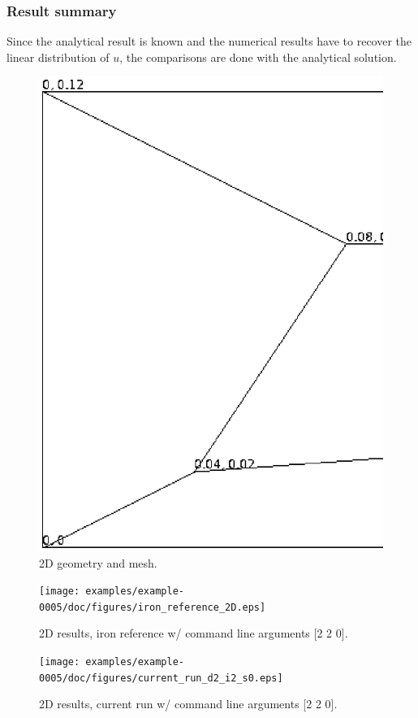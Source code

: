 \subsubsection{Result summary}
%
Since the analytical result is known and the numerical results have to recover the linear distribution of $u$, the comparisons are done with the analytical solution.
%


%
\begin{figure}[h!]
    \centering 
    \includegraphics[width=0.9\columnwidth]{examples/example-0005/doc/figures/2d_mesh.eps} 
    \caption{2D geometry and mesh.}
    \label{3d-mesh-fig}
\end{figure}
%
\begin{figure}[h!]
    \centering 
    \texttt{[image: examples/example-0005/doc/figures/iron\_reference\_2D.eps]} 
    \caption{2D results, iron reference w/ command line arguments [2 2 0].}
    \label{example-0005-iron-2D-reference-fig}
\end{figure}
%
\begin{figure}[h!]
    \centering 
    \texttt{[image: examples/example-0005/doc/figures/current\_run\_d2\_i2\_s0.eps]} 
    \caption{2D results, current run w/ command line arguments [2 2 0].}
    \label{example-0005-current-run-2D-fig}
\end{figure}
